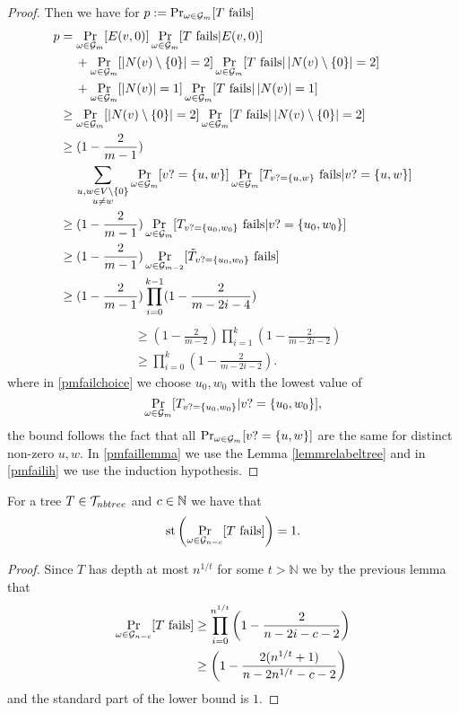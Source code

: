 \begin{proof}
Then we have for $p:=\Pr_{\omega\in\mathcal{G}_m}[\text{$T$ fails}]$
\begin{align}
p&=\Pr_{\omega\in\mathcal{G}_m}[E(v,0)]\Pr_{\omega\in\mathcal{G}_m}[\text{$T$ fails}|E(v,0)]\\
&\:\phantom{=}\:+\Pr_{\omega\in\mathcal{G}_m}[\left|{N(v)\setminus\{0\}}\right|=2]\Pr_{\omega\in\mathcal{G}_m}[\text{$T$ fails}|\left|{N(v)\setminus\{0\}}\right|=2]\\
&\:\phantom{=}\:+\Pr_{\omega\in\mathcal{G}_m}[\left|{N(v)}\right|=1]\Pr_{\omega\in\mathcal{G}_m}[\text{$T$ fails}|\left|{N(v)}\right|=1]\\
&\geq \Pr_{\omega\in\mathcal{G}_m}[\left|{N(v)\setminus\{0\}}\right|=2]\Pr_{\omega\in\mathcal{G}_m}[\text{$T$ fails}|\left|{N(v)\setminus\{0\}}\right|=2]\\
&\geq (1-\frac{2}{m-1})\\
&\:\phantom{=}\:\sum_{\substack{u,w\in V\setminus \{0\} \\ u\not= w}}\Pr_{\omega\in\mathcal{G}_m}[v?=\{u,w\}]\Pr_{\omega\in\mathcal{G}_m}[T_{v?=\{u,w\}}\text{ fails}|v?=\{u,w\}]\\
&\geq(1-\frac{2}{m-1})\Pr_{\omega\in\mathcal{G}_m}[T_{v?=\{u_0,w_0\}}\text{ fails}|v?=\{u_0,w_0\}]\label{pmfailchoice}\\
&\geq(1-\frac{2}{m-1})\Pr_{\omega\in\mathcal{G}_{m-2}}[\tilde T_{v?=\{u_0,w_0\}}\text{ fails}]\label{pmfaillemma}\\
&\geq(1-\frac{2}{m-1})\prod_{i=0}^{k-1}(1-\frac{2}{m-2i-4})\label{pmfailih}
\end{align}
\begin{align}
&\geq(1-\frac{2}{m-2})\prod_{i=1}^{k}(1-\frac{2}{m-2i-2})\\
&\geq\prod_{i=0}^{k}(1-\frac{2}{m-2i-2}).
\end{align}
where in \eqref{pmfailchoice} we choose $u_0,w_0$ with the lowest value of \[\Pr_{\omega\in\mathcal{G}_m}[\text{$T_{v?=\{u_0,w_0\}}|v?=\{u_0,w_0\}$}],\] the bound follows the fact that all $\Pr_{\omega\in\mathcal{G}_m}[v?=\{u,w\}]$ are the same for distinct non-zero $u,w$. In \eqref{pmfaillemma} we use the Lemma \ref{lemmrelabeltree} and in \eqref{pmfailih} we use the induction hypothesis.
\end{proof}

\begin{crll}\label{crllpPathtreefail}
For a tree $T\in \mathcal{T}_{nbtree}$ and $c\in \mathbb{N}$ we have that
\[\text{st}\left(\Pr_{\omega\in\mathcal{G}_{n-c}}[T\text{ fails}]\right)= 1.\]
\end{crll}
\begin{proof}
Since $T$ has depth at most $n^{1/t}$ for some $t>\mathbb{N}$ we by the previous lemma that
\begin{align}
\Pr_{\omega\in\mathcal{G}_{n-c}}[\text{$T$ fails}]&\geq \prod_{i=0}^{n^{1/t}}\left(1-\frac{2}{n-2i-c-2}\right)\\
&\geq \left(1-\frac{2(n^{1/t}+1)}{n-2n^{1/t}-c-2}\right)
\end{align}
and the standard part of the lower bound is $1$.
\end{proof}

